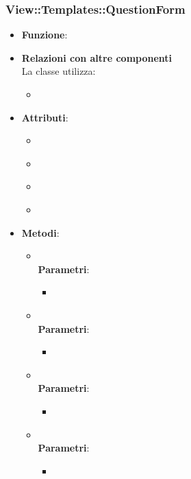 \subsubsection{View::Templates::QuestionForm}
\begin{itemize}
\item\textbf{Funzione}:
\item\textbf{Relazioni con altre componenti}\\
La classe utilizza:
	\begin{itemize}
		\item
	\end{itemize}
\item\textbf{Attributi}:
	\begin{itemize}
		\item\code{}\\
		\item\code{}\\
		\item\code{}\\
		\item\code{}\\
	\end{itemize}
\item\textbf{Metodi}:
	\begin{itemize}
		\item\code{}\\
		\textbf{Parametri}:
			\begin{itemize}
				\item\code{}\\
			\end{itemize}
		\item\code{}\\
		\textbf{Parametri}:
			\begin{itemize}
				\item\code{}\\
			\end{itemize}
		\item\code{}\\
		\textbf{Parametri}:
			\begin{itemize}
				\item\code{}\\
			\end{itemize}
		\item\code{}\\
		\textbf{Parametri}:
			\begin{itemize}
				\item\code{}\\
			\end{itemize}
	\end{itemize}
\end{itemize}

